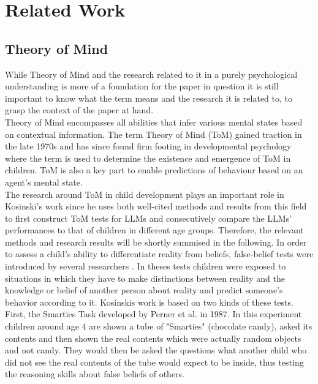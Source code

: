 \section{Related Work}
\subsection{Theory of Mind}
While Theory of Mind and the research related to it in a purely psychological understanding is more of a foundation for the paper in question it is still important to know what the term means and the research it is related to, to grasp the context of the paper at hand.\\
Theory of Mind encompasses all abilities that infer various mental states based on contextual information. The term Theory of Mind (ToM) gained traction in the late 1970s and has since found firm footing in developmental psychology where the term is used to determine the existence and emergence of ToM in children. ToM is also a key part to enable predictions of behaviour based on an agent's mental state.\cite{theory_of_mind}\\
The research around ToM in child development plays an important role in Kosinski's work since he uses both well-cited methods and results from this field to first construct ToM tests for LLMs and consecutively compare the LLMs' performances to that of children in different age groups. Therefore, the relevant methods and research results will be shortly summised in the following. In order to assess a child's ability to differentiate reality from beliefs, false-belief tests were introduced by several researchers \cite{fb_test_places_1,fb_test_places_2,fb_test_contents}. In theses tests children were exposed to situations in which they have to make distinctions between reality and the knowledge or belief of another person about reality and predict someone's behavior according to it. Kosinskis work is based on two kinds of these tests.\\
First, the Smarties Task developed by Perner et al. in 1987. In this experiment children around age 4 are shown a tube of "Smarties" (chocolate candy), asked its contents and then shown the real contents which were actually random objects and not candy. They would then be asked the questions what another child who did not see the real contents of the tube would expect to be inside, thus testing the reasoning skills about false beliefs of others. \cite{fb_test_contents}
